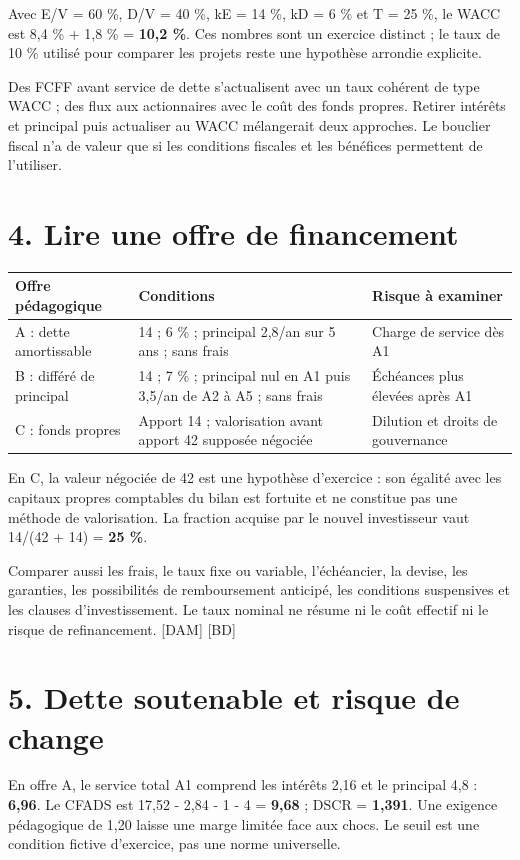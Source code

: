 \documentclass[12pt,a4paper]{article}
\begin{document}
Avec E/V = 60 \%, D/V = 40 \%, kE = 14 \%, kD = 6 \% et T = 25 \%, le WACC est 8,4 \% + 1,8 \% = \textbf{10,2 \%}. Ces nombres sont un exercice distinct ; le taux de 10 \% utilisé pour comparer les projets reste une hypothèse arrondie explicite.


Des FCFF avant service de dette s’actualisent avec un taux cohérent de type WACC ; des flux aux actionnaires avec le coût des fonds propres. Retirer intérêts et principal puis actualiser au WACC mélangerait deux approches. Le bouclier fiscal n’a de valeur que si les conditions fiscales et les bénéfices permettent de l’utiliser.

\section*{4. Lire une offre de financement}

\Needspace{180pt}
\begin{longtable}{p{5.07cm}p{5.07cm}p{5.07cm}}
\toprule
Offre pédagogique & Conditions & Risque à examiner \\
\midrule\endhead
A : dette amortissable & 14 ; 6 \% ; principal 2,8/an sur 5 ans ; sans frais & Charge de service dès A1 \\
B : différé de principal & 14 ; 7 \% ; principal nul en A1 puis 3,5/an de A2 à A5 ; sans frais & Échéances plus élevées après A1 \\
C : fonds propres & Apport 14 ; valorisation avant apport 42 supposée négociée & Dilution et droits de gouvernance \\
\bottomrule
\end{longtable}

En C, la valeur négociée de 42 est une hypothèse d’exercice : son égalité avec les capitaux propres comptables du bilan est fortuite et ne constitue pas une méthode de valorisation. La fraction acquise par le nouvel investisseur vaut 14/(42 + 14) = \textbf{25 \%}.


Comparer aussi les frais, le taux fixe ou variable, l’échéancier, la devise, les garanties, les possibilités de remboursement anticipé, les conditions suspensives et les clauses d’investissement. Le taux nominal ne résume ni le coût effectif ni le risque de refinancement. [DAM] [BD]

\section*{5. Dette soutenable et risque de change}
En offre A, le service total A1 comprend les intérêts 2,16 et le principal 4,8 : \textbf{6,96}. Le CFADS est 17,52 - 2,84 - 1 - 4 = \textbf{9,68} ; DSCR = \textbf{1,391}. Une exigence pédagogique de 1,20 laisse une marge limitée face aux chocs. Le seuil est une condition fictive d’exercice, pas une norme universelle.
\end{document}
